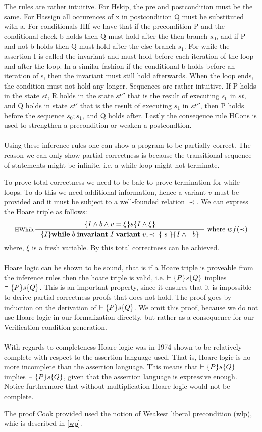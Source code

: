 The rules are rather intuitive.
For Hskip, the pre and postcondition must be the same.
For Hassign all occurences of x in postcondition Q must be substituted with a.
For conditionals HIf we have that if the precondition P and the conditional check b holds then Q must hold after the then branch $s_{0}$, and if P and not b holds then Q must hold after the else branch $s_1$.
For while the assertion I is called the invariant and must hold before each iteration of the loop and after the loop.
In a similar fashion if the conditional b holds before an iteration of s, then the invariant must still hold afterwards.
When the loop ends, the condition must not hold any longer.
Sequences are rather intuitive. If P holds in the state $st$, R holds in the state $st''$ that
is the result of executing $s_{0}$ in $st$, and Q holds in state $st'$ that is the result of
executing $s_{1}$ in $st''$, then P holds before the sequence $s_{0}; s_{1}$, and Q holds after.
Lastly the conseqeuce rule HCons is used to strengthen a precondition or weaken a postcondtion.
\\~\\
Using these inference rules one can show a program to be partially correct.
The reason we can only show partial correctness is because the transitional sequence of statements might be infinite, i.e. a while loop might not terminate.

To prove total correctness we need to be bale to prove termination for while-loops.
To do this we need additional information, hence a variant $v$ must be provided and it must
be subject to a well-founded relation $\prec$.
We can express the Hoare triple as follows:
\[
\inference[HWhile]{\hoare{I \wedge b \wedge v = \xi }{s}{I \wedge \xi}}
{\hoare{I}{ \mathbf{while} \; b \; \mathbf{invariant} \; I \; \mathbf{variant} \; v, \prec \; \{ \; s \; \} }{I \wedge \neg b}} \; \text{where} \; wf(\prec)
\]
where, $\xi$ is a fresh variable. By this total correctness can be achieved.
\\~\\
Hoare logic can be shown to be sound, that is if a Hoare triple is proveable from the inference rules then the hoare triple is valid, i.e. $\vdash \{P\}s\{Q\}$ implies $\vDash \{P\}s\{Q\}$. This is an important
property, since it ensures that it is impossible to derive partial correctness proofs that does not hold.
The proof goes by induction on the derivation of $\vdash \{P\}s\{Q\}$.
We omit this proof, because we do not use Hoare logic in our formalization directly, but rather as a consequence for our Verification condition generation.
\\~\\
With regards to completeness Hoare logic was in 1974 shown to be relatively complete with respect to the assertion language used\cite{cook}.
That is, Hoare logic is no more incomplete than the assertion language.
This means that $\vdash \{P\}s\{Q\}$ implies $\vDash \{P\}s\{Q\}$, given that the assertion language is expressive enough.
Notice furthermore that without multiplication Hoare logic would not be complete.

The proof Cook provided used the notion of Weakest liberal precondition (wlp), whic is
described in \ref{wp}.
